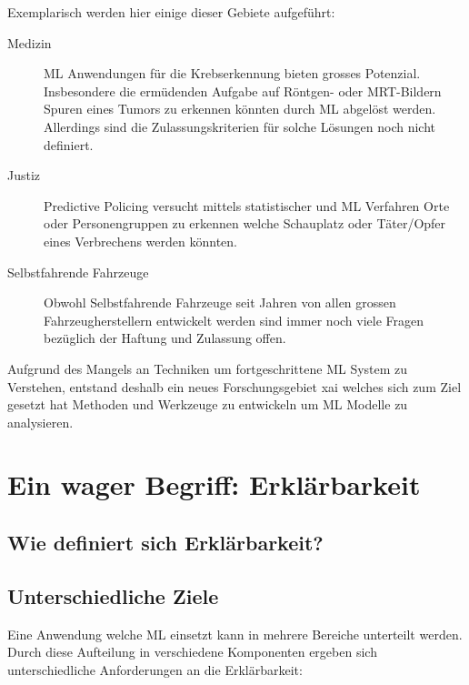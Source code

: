 \documentclass[
  12pt, %
  a4paper, %
  oneside, %
  openany, 
  numbers=noenddot, %
  BCOR=5mm, %
  parskip=half*, %
  thesis, %
]{bfhbook}
\begin{document}
 Exemplarisch werden hier einige dieser Gebiete aufgeführt:

\begin{description}
  \item[Medizin] \gls{ML} Anwendungen für die Krebserkennung bieten grosses Potenzial. Insbesondere die ermüdenden Aufgabe auf Röntgen- oder MRT-Bildern Spuren eines Tumors zu erkennen könnten durch \gls{ML} abgelöst werden. Allerdings sind die Zulassungskriterien für solche Lösungen noch nicht definiert.
  \item[Justiz] Predictive Policing versucht mittels statistischer und \gls{ML} Verfahren Orte oder Personengruppen zu erkennen welche  Schauplatz oder Täter/Opfer eines Verbrechens werden könnten.
  \item[Selbstfahrende Fahrzeuge] Obwohl Selbstfahrende Fahrzeuge seit Jahren von allen grossen Fahrzeugherstellern entwickelt werden sind immer noch viele Fragen bezüglich der Haftung und Zulassung offen.
\end{description}

Aufgrund des Mangels an Techniken um fortgeschrittene \gls{ML} System zu Verstehen, entstand deshalb ein neues Forschungsgebiet \acrfull{xai} welches sich zum Ziel gesetzt hat Methoden und Werkzeuge zu entwickeln um \gls{ML} Modelle zu analysieren.

\chapter{Ein wager Begriff: Erklärbarkeit}
\section{Wie definiert sich Erklärbarkeit?}
\section{Unterschiedliche Ziele}
Eine Anwendung welche \acrfull{ML} einsetzt kann in mehrere Bereiche unterteilt werden.  Durch diese Aufteilung in verschiedene  Komponenten ergeben sich unterschiedliche Anforderungen an die Erklärbarkeit: \parencite{XAI2018}
\end{document}
